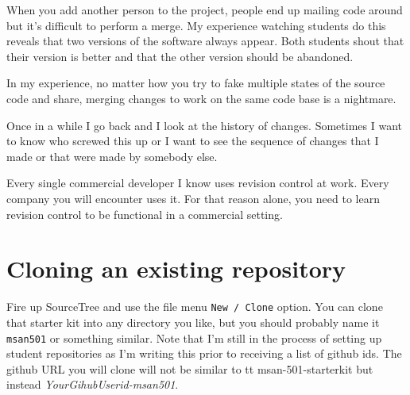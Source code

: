 When you add another person to the project, people end up mailing code around but it's difficult to perform a merge. My experience watching students do this reveals that two versions of the software always appear. Both students shout that their version is better and that the other version should be abandoned.

In my experience, no matter how you try to fake multiple states of the source code and share, merging changes to work on the same code base is a nightmare.

Once in a while I go back and I look at the history of changes. Sometimes I want to know who screwed this up or I want to see the sequence of changes that I made or that were made by somebody else.

Every single commercial developer I know uses revision control at work. Every company you will encounter uses it. For that reason alone, you need to learn revision control to be functional in a commercial setting.

\section{Cloning an existing repository}

Fire up SourceTree and use the file menu {\tt New / Clone} option. You can clone that starter kit into any directory you like, but you should probably name it {\tt msan501} or something similar. Note that I'm still in the process of setting up student repositories as I'm writing this prior to receiving a list of github ids. The github URL you will clone will not be similar to {tt msan-501-starterkit} but instead {\em YourGihubUserid-msan501}.
\vspace{5mm}

